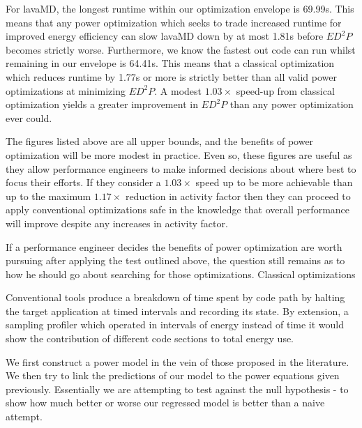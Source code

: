 For lavaMD, the longest runtime within our optimization envelope is 69.99s. This means that any power optimization which seeks to trade increased runtime for improved energy efficiency can slow lavaMD down by at most 1.81s before $ED^2P$ becomes strictly worse. Furthermore, we know the fastest out code can run whilst remaining in our envelope is 64.41s. This means that a classical optimization which reduces runtime by 1.77s or more is strictly better than all valid power optimizations at minimizing $ED^2P$. A modest $1.03\times$ speed-up from classical optimization yields a greater improvement in $ED^2P$ than any power optimization ever could.

The figures listed above are all upper bounds, and the benefits of power optimization will be more modest in practice. Even so, these figures are useful as they allow performance engineers to make informed decisions about where best to focus their efforts. If they consider a $1.03 \times$ speed up to be more achievable than up to the maximum $1.17\times$ reduction in activity factor then they can proceed to apply conventional optimizations safe in the knowledge that overall performance will improve despite any increases in activity factor.

If a performance engineer decides the benefits of power optimization are worth pursuing after applying the test outlined above, the question still remains as to how he should go about searching for those optimizations. Classical optimizations 


Conventional tools produce a breakdown of time spent by code path by halting the target application at timed intervals and recording its state. By extension, a sampling profiler which operated in intervals of energy instead of time it would show the contribution of different code sections to total energy use.

We first construct a power model in the vein of those proposed in the literature. We then try to link the predictions of our model to the power equations given previously. Essentially we are attempting to test against the null hypothesis - to show how much better or worse our regressed model is better than a naive attempt.





